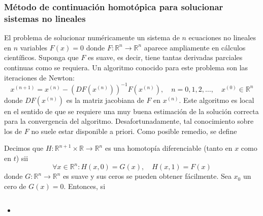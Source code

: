 \begin{frame}
	\frametitle{
		Método de continuación homotópica para solucionar sistemas no
		lineales
	}

	El problema de solucionar numéricamente un sistema de $n$
	ecuaciones no lineales en $n$ variables $F\left(x\right)=0$
	donde
	\begin{math}
		F\colon\mathbb{R}^{n}\to\mathbb{R}^{n}
	\end{math}
	aparece ampliamente en cálculos científicos.
	Suponga que $F$ es suave, es decir, tiene tantas derivadas
	parciales continuas como se requiera.
	Un algoritmo conocido para este problema son las
	\alert{iteraciones de Newton}:
	\begin{equation*}
		x^{\left(n+1\right)}=
		x^{\left(n\right)}-
		{\left(DF\left(x^{\left(n\right)}\right)\right)}^{-1}
		F\left(x^{\left(n\right)}\right),\quad
		n=0,1,2,\dotsc,\quad
		x^{\left(0\right)}\in\mathbb{R}^{n}
	\end{equation*}
	donde
	\begin{math}
		DF\left(x^{\left(n\right)}\right)
	\end{math}
	es la \alert{matriz jacobiana} de $F$ en $x^{\left(n\right)}$.
	Este algoritmo es \alert{local} en el sentido de que se requiere
	una muy buena estimación de la solución correcta para la
	convergencia del algoritmo.
	Desafortunadamente, tal conocimiento sobre los de $F$ no suele
	estar disponible a priori.
	Como posible remedio, se define

	\begin{definition}
		Decimos que
		\begin{math}
			H\colon
			\mathbb{R}^{n+1}\times\mathbb{R}\to
			\mathbb{R}^{n}
		\end{math}
		es una \alert{homotopía diferenciable} (tanto en $x$ como en $t$)
		sii
		\begin{equation*}
			\forall x\in\mathbb{R}^{n}:
			H\left(x,0\right)=
			G\left(x\right),\quad
			H\left(x,1\right)=
			F\left(x\right)
		\end{equation*}
		donde
		\begin{math}
			G\colon\mathbb{R}^{n}\to\mathbb{R}^{n}
		\end{math}
		es suave y sus ceros se pueden obtener fácilmente.
		Sea $x_{0}$ un cero de $G\left(x\right)=0$.
		Entonces, si
	\end{definition}

	\begin{columns}
		\begin{column}{0.48\textwidth}
			\begin{itemize}
				\item


\end{itemize}
\end{column}
\end{columns}
\end{frame}
